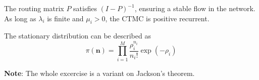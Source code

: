 \begin{solution}
    The routing matrix $P$ satisfies $(I - P )^{-1}$, ensuring a stable flow in the network. As long as $\lambda_i$ is finite and $\mu_i > 0$, the CTMC is positive recurrent.

    The stationary distribution can be described as
    \[
        \pi(\mathbf{n}) = \prod_{i=1}^M\frac{\rho_i^{n_i}}{n_i!}\exp(-\rho_i)
    \]

    \textbf{Note}: The whole excercise is a variant on Jackson's theorem.
\end{solution}
